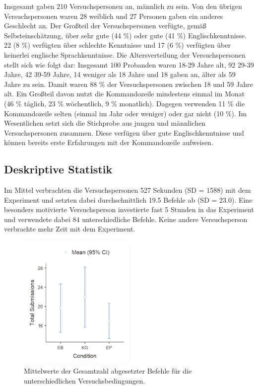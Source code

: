 Insgesamt gaben 210 Versuchspersonen an, männlich zu sein. Von den übrigen Versuchspersonen waren 28 weiblich und 27 Personen gaben ein anderes Geschlecht an. Der Großteil der Versuchspersonen verfügte, gemäß Selbsteinschätzung, über sehr gute (44 \%) oder gute (41 \%) Englischkenntnisse. 22 (8 \%) verfügten über schlechte Kenntnisse und 17 (6 \%) verfügten über keinerlei englische Sprachkenntnisse. Die Altersverteilung der Versuchspersonen stellt sich wie folgt dar: Insgesamt 100 Probanden waren 18-29 Jahre alt, 92  29-39 Jahre,  42 39-59 Jahre, 14 weniger als 18 Jahre und 18 gaben an, älter als 59 Jahre zu sein. Damit waren 88 \% der Versuchspersonen zwischen 18 und 59 Jahre alt. Ein Großteil davon nutzt die Kommandozeile mindestens einmal im Monat (46 \% täglich, 23 \% wöchentlich, 9 \% monatlich). Dagegen verwenden 11 \% die Kommandozeile selten (einmal im Jahr oder weniger) oder gar nicht (10 \%). Im Wesentlichen setzt sich die Stichprobe aus jungen und männlichen Versuchspersonen zusammen. Diese verfügen über gute Englischkenntnisse und können bereits erste Erfahrungen mit der Kommandozeile aufweisen.

\subsection{Deskriptive Statistik}
Im Mittel verbrachten die Versuchspersonen 527 Sekunden (SD = 1588) mit dem Experiment und setzten dabei durchschnittlich 19.5 Befehle ab (SD = 23.0). Eine besonders motivierte Versuchsperson investierte fast 5 Stunden in das Experiment und verwendete dabei 84 unterschiedliche Befehle. Keine andere Versuchsperson verbrachte mehr Zeit mit dem Experiment.

\begin{figure}[htbp]
    \centering
    \includegraphics[width=0.5\textwidth]{img/auswertung/mean_subs.png}
    \caption{Mittelwerte der Gesamtzahl abgesetzter Befehle für die unterschiedlichen Versuchsbedingungen.}
    \label{mean_subs}
\end{figure}

